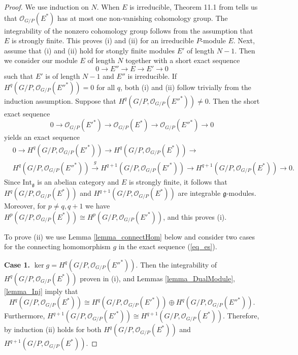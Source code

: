 \documentclass[12pt]{article}
\newcommand{\Int} {\mathrm{Int}}
\def \OO {{\mathcal O}}
\def \g {\mathfrak{g}}
\begin{document}
\begin{proof}
 We use induction on $N$. When $E$ is irreducible, Theorem 11.1 from \cite{DPW} tells us that $\OO_{G/P}(E^*)$ has at most one non-vanishing cohomology group. The integrability of the nonzero cohomology group follows from the assumption that $E$ is strongly finite. This proves (i) and (ii) for an irreducible $P$-module $E$. Next, assume that (i) and (ii) hold for stongly finite modules $E'$ of length $N-1$. Then we consider our module $E$ of length $N$ together with a short exact sequence
$$
0 \rightarrow E'' \rightarrow E \rightarrow E' \rightarrow 0
$$ 
such that $E'$ is of length $N-1$ and $E''$ is irreducible. If $H^q(G/P, \OO_{G/P}(E''^*))  = 0$ for all $q$, both (i) and (ii) follow trivially from the induction assumption.
Suppose that  $H^q(G/P, \OO_{G/P}(E''^*)) \neq 0$. Then the short exact sequence 
$$
0 \rightarrow \OO_{G/P}(E'^*) \rightarrow \OO_{G/P}(E^*) \rightarrow \OO_{G/P}(E''^*) \rightarrow 0
$$
yields an exact sequence
\begin{equation} \label{eq_es}
\begin{aligned} 
&0 \rightarrow H^{q}(G/P, \OO_{G/P}(E'^*))\rightarrow H^{q}(G/P, \OO_{G/P}(E^*)) \rightarrow \\
&H^{q}(G/P, \OO_{G/P}(E''^*)) \stackrel{g}{\rightarrow} H^{q+1}(G/P, \OO_{G/P}(E'^*)) \rightarrow H^{q+1}(G/P, \OO_{G/P}(E^*)) \rightarrow 0.
\end{aligned}
\end{equation}
Since $\Int_{\g}$ is an abelian category and $E$ is strongly finite, it follows that $H^{q}(G/P, \OO_{G/P}(E^*))$ and $H^{q+1}(G/P, \OO_{G/P}(E^*))$ are integrable $\g$-modules. %
Moreover, for $p \neq q, q+1$ we have $H^{p}(G/P, \OO_{G/P}(E^*)) \cong H^{p}(G/P, \OO_{G/P}(E'^*))$, and this proves (i). 

To prove (ii) we use Lemma \ref{lemma_connectHom} below and consider two cases for the connecting homomorphism $g$ in the exact sequence (\ref{eq_es}).

{\bf Case 1.} $\ker g = H^{q}(G/P, \OO_{G/P}(E''^*))$. Then the integrability of $H^{q}(G/P, \OO_{G/P}(E^*))$ proven in (i), and Lemmas \ref{lemma_DualModule}, \ref{lemma_Inj} imply that 
$$H^{q}(G/P, \OO_{G/P}(E^*))\cong H^{q}(G/P, \OO_{G/P}(E'^*)) \oplus H^{q}(G/P, \OO_{G/P}(E''^*)).
$$ Furthermore, $H^{q+1}(G/P, \OO_{G/P}(E'^*)) \cong H^{q+1}(G/P, \OO_{G/P}(E^*))$. Therefore, by induction (ii) holds for both $H^{q}(G/P, \OO_{G/P}(E^*))$ and $H^{q+1}(G/P, \OO_{G/P}(E^*))$. 


\end{proof}
\end{document}

